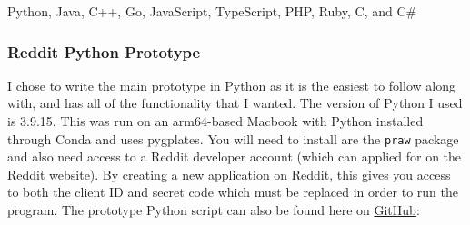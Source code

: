 \documentclass{article}
\theoremstyle{theorem}
\theoremstyle{definition}
\theoremstyle{remark}
\begin{document}
\noindent
Python, Java, C++, Go, JavaScript, TypeScript, PHP, Ruby, C, and C#

\subsubsection{Reddit Python Prototype}
I chose to write the main prototype in Python as it is the easiest to follow along with, and has all of the functionality that I wanted. The version of Python I used is 3.9.15. This was run on an arm64-based Macbook with Python installed through Conda and uses pygplates. You will need to install are the \verb |praw| package and also need access to a Reddit developer account (which can applied for on the Reddit website). By creating a new application on Reddit, this gives you access to both the client ID and secret code which must be replaced in order to run the program. The prototype Python script can also be found here on \href{https://github.com/dapak2002/Programming-Language-Reddit-Scraper}{GitHub}:
\end{document}

